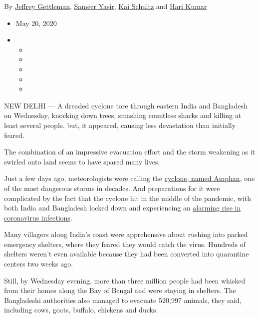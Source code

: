 By
\href{https://www.nytimes3xbfgragh.onion/by/jeffrey-gettleman}{Jeffrey
Gettleman},
\href{https://www.nytimes3xbfgragh.onion/by/sameer-yasir}{Sameer Yasir},
\href{https://www.nytimes3xbfgragh.onion/by/kai-schultz}{Kai Schultz}
and \href{https://www.nytimes3xbfgragh.onion/by/hari-kumar}{Hari Kumar}

\begin{itemize}
\item
  May 20, 2020
\item
  \begin{itemize}
  \item
  \item
  \item
  \item
  \item
  \end{itemize}
\end{itemize}

NEW DELHI --- A dreaded cyclone tore through eastern India and
Bangladesh on Wednesday, knocking down trees, smashing countless shacks
and killing at least several people, but, it appeared, causing less
devastation than initially feared.

The combination of an impressive evacuation effort and the storm
weakening as it swirled onto land seems to have spared many lives.

Just a few days ago, meteorologists were calling the
\href{https://www.nytimes3xbfgragh.onion/2020/05/21/world/asia/cyclone-amphan-india-bangladesh.html}{cyclone,
named Amphan}, one of the most dangerous storms in decades. And
preparations for it were complicated by the fact that the cyclone hit in
the middle of the pandemic, with both India and Bangladesh locked down
and experiencing an
\href{https://timesofindia.indiatimes.com/india/covid-19-cases-in-india-cross-1-lakh-mark-over-3000-dead/articleshow/75816534.cms}{alarming
rise in coronavirus infections}.

Many villagers along India's coast were apprehensive about rushing into
packed emergency shelters, where they feared they would catch the virus.
Hundreds of shelters weren't even available because they had been
converted into quarantine centers two weeks ago.

Still, by Wednesday evening, more than three million people had been
whisked from their homes along the Bay of Bengal and were staying in
shelters. The Bangladeshi authorities also managed to evacuate 520,997
animals, they said, including cows, goats, buffalo, chickens and ducks.

